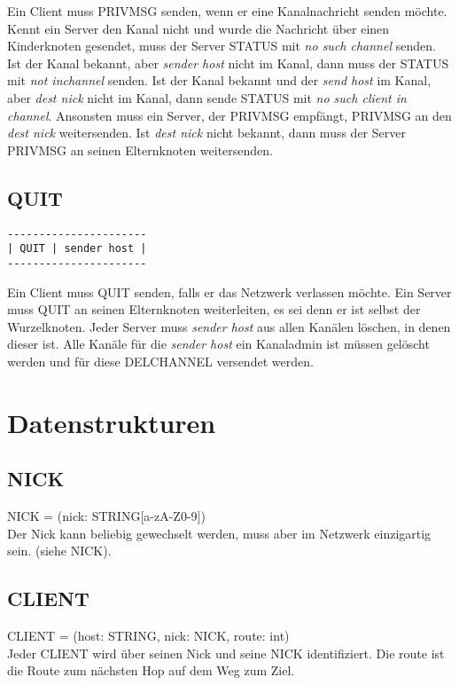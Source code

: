 \documentclass{article}
\begin{document}
Ein Client muss PRIVMSG senden, wenn er eine Kanalnachricht senden möchte.
Kennt ein Server den Kanal nicht und wurde die Nachricht über einen Kinderknoten gesendet, muss der Server STATUS mit \emph{no such channel} senden.
Ist der Kanal bekannt, aber \emph{sender host} nicht im Kanal, dann muss der STATUS mit \emph{not inchannel} senden.
Ist der Kanal bekannt und der \emph{send host} im Kanal, aber \emph{dest nick} nicht im Kanal, dann sende STATUS mit \emph{no such client in channel}.
Ansonsten muss ein Server, der PRIVMSG empfängt, PRIVMSG an den \emph{dest nick} weitersenden.
Ist \emph{dest nick} nicht bekannt, dann muss der Server PRIVMSG an seinen Elternknoten weitersenden.

\subsection{QUIT}

\begin{lstlisting}
----------------------
| QUIT | sender host |
----------------------
\end{lstlisting}

Ein Client muss QUIT senden, falls er das Netzwerk verlassen möchte.
Ein Server muss QUIT an seinen Elternknoten weiterleiten, es sei denn er ist selbst der Wurzelknoten.
Jeder Server muss \emph{sender host} aus allen Kanälen löschen, in denen dieser ist.
Alle Kanäle für die \emph{sender host} ein Kanaladmin ist müssen gelöscht werden und für diese DELCHANNEL versendet werden.

\section{Datenstrukturen}

\subsection{NICK}

NICK = (nick: STRING[a-zA-Z0-9])\\
Der Nick kann beliebig gewechselt werden, muss aber im Netzwerk einzigartig sein. (siehe NICK).

\subsection{CLIENT}

CLIENT = (host: STRING, nick: NICK, route: int)\\
Jeder CLIENT wird über seinen Nick und seine NICK identifiziert. Die route ist die Route zum nächsten Hop auf dem Weg zum Ziel.
\end{document}
